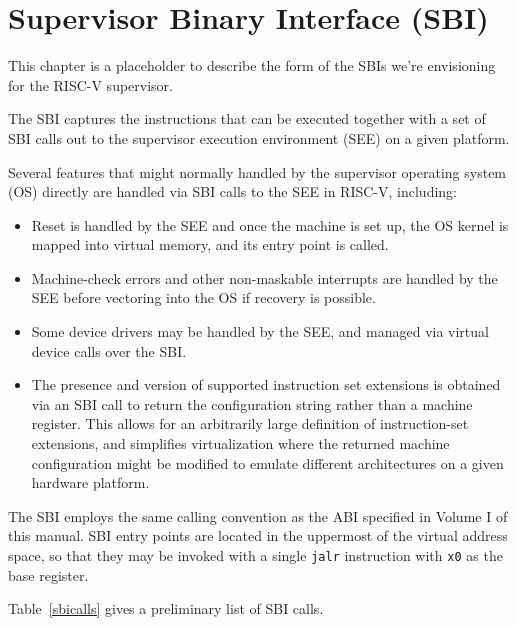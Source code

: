 \chapter{Supervisor Binary Interface (SBI)}

This chapter is a placeholder to describe the form of the SBIs we're
envisioning for the RISC-V supervisor.

The SBI captures the instructions that can be executed together with a
set of SBI calls out to the supervisor execution environment (SEE) on
a given platform.

Several features that might normally handled by the supervisor
operating system (OS) directly are handled via SBI calls to the SEE in
RISC-V, including:

\begin{itemize}

\item Reset is handled by the SEE and once the machine is set up, the
  OS kernel is mapped into virtual memory, and its entry point is called.

\item Machine-check errors and other non-maskable interrupts are
  handled by the SEE before vectoring into the OS if recovery is
  possible.

\item Some device drivers may be handled by the SEE, and managed via
  virtual device calls over the SBI.

\item The presence and version of supported instruction set extensions
  is obtained via an SBI call to return the configuration string
  rather than a machine register.  This allows for an arbitrarily
  large definition of instruction-set extensions, and simplifies
  virtualization where the returned machine configuration might be
  modified to emulate different architectures on a given hardware
  platform.

\end{itemize}

The SBI employs the same calling convention as the ABI specified in Volume
I of this manual.  SBI entry points are located in the uppermost
 of the virtual address space, so that they may be invoked with
a single {\tt jalr} instruction with {\tt x0} as the base register.

Table~\ref{sbicalls} gives a preliminary list of SBI calls.

